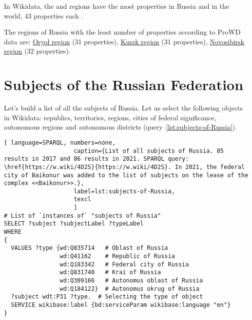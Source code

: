 In Wikidata, the  and  regions have the most properties in Russia and in the world, 43 properties each \autocite{Russia_prowd}.

The regions of Russia with the least number of properties according to ProWD data are: \href{http://www.wikidata.org/entity/Q3129 }{Oryol region} (31 properties), \href{http://www.wikidata.org/entity/Q3178 }{Kursk region} (31 properties), \href{http://www.wikidata.org/entity/Q5851 }{Novosibirsk region} (32 properties).

\section{Subjects of the Russian Federation}

Let's build a list of all the subjects of Russia. Let us select the following objects in Wikidata: republics, territories, regions, cities of federal significance, autonomous regions and autonomous districts (query~\protect\ref{lst:subjects-of-Russia}).


\begin{lstlisting}[ language=SPARQL, numbers=none,
                    caption={List of all subjects of Russia. 85 results in 2017 and 86 results in 2021. SPARQL query: \href{https://w.wiki/4D2S}{https://w.wiki/4D2S}. In 2021, the federal city of Baikonur was added to the list of subjects on the lease of the complex <<Baikonur>>.},
                    label=lst:subjects-of-Russia,
                    texcl 
                    ]
# List of `instances of` "subjects of Russia" 
SELECT ?subject ?subjectLabel ?typeLabel
WHERE
{  
  VALUES ?type {wd:Q835714   # Oblast of Russia
                wd:Q41162    # Republic of Russia
                wd:Q183342   # Federal city of Russia
                wd:Q831740   # Krai of Russia
                wd:Q309166   # Autonomus oblast of Russia
                wd:Q184122}  # Autonomus okrug of Russia
  ?subject wdt:P31 ?type.  # Selecting the type of object
  SERVICE wikibase:label {bd:serviceParam wikibase:language "en"}
}
\end{lstlisting}%

